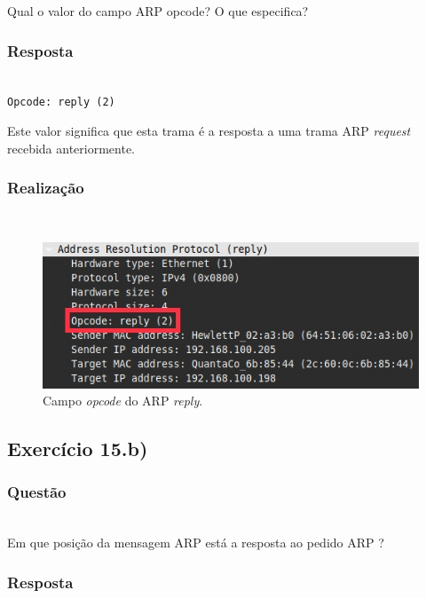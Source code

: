 \documentclass{llncs}
\begin{document}
Qual o valor do campo ARP opcode? O que especifica?

\subsubsection{Resposta}\rule[-10pt]{0pt}{10pt}\\

\texttt{Opcode: reply (2)}

Este valor significa que esta trama é a resposta a uma trama ARP \textit{request} recebida anteriormente.

\subsubsection{Realização}\rule[-10pt]{0pt}{10pt}\\

\begin{figure}
  \begin{center}
	  \includegraphics[scale=0.6]{./imagens/arp_reply_opcode.png} 
  \end{center}
	\caption{Campo \textit{opcode} do ARP \textit{reply}.}
  \label{fig:arp_reply_opcode}
\end{figure} 


\clearpage
\subsection{Exercício 15.b)}
\subsubsection{Questão}\rule[-10pt]{0pt}{10pt}\\

Em que posição da mensagem ARP está a resposta ao pedido ARP ?

\subsubsection{Resposta}\rule[-10pt]{0pt}{10pt}\\
\end{document}
